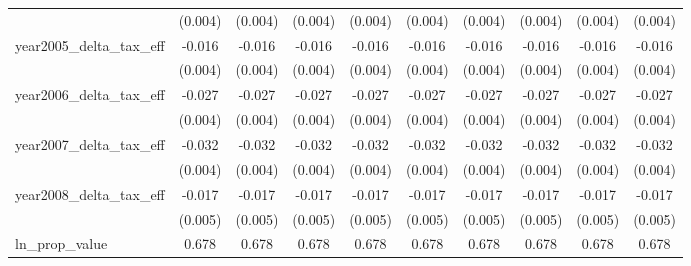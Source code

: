 {\begin{tabular}{l*{9}{c}}
            &     (0.004)         &     (0.004)         &     (0.004)         &     (0.004)         &     (0.004)         &     (0.004)         &     (0.004)         &     (0.004)         &     (0.004)         \\
[1em]
year2005_delta_tax_eff&      -0.016\sym{***}&      -0.016\sym{***}&      -0.016\sym{***}&      -0.016\sym{***}&      -0.016\sym{***}&      -0.016\sym{***}&      -0.016\sym{***}&      -0.016\sym{***}&      -0.016\sym{***}\\
            &     (0.004)         &     (0.004)         &     (0.004)         &     (0.004)         &     (0.004)         &     (0.004)         &     (0.004)         &     (0.004)         &     (0.004)         \\
[1em]
year2006_delta_tax_eff&      -0.027\sym{***}&      -0.027\sym{***}&      -0.027\sym{***}&      -0.027\sym{***}&      -0.027\sym{***}&      -0.027\sym{***}&      -0.027\sym{***}&      -0.027\sym{***}&      -0.027\sym{***}\\
            &     (0.004)         &     (0.004)         &     (0.004)         &     (0.004)         &     (0.004)         &     (0.004)         &     (0.004)         &     (0.004)         &     (0.004)         \\
[1em]
year2007_delta_tax_eff&      -0.032\sym{***}&      -0.032\sym{***}&      -0.032\sym{***}&      -0.032\sym{***}&      -0.032\sym{***}&      -0.032\sym{***}&      -0.032\sym{***}&      -0.032\sym{***}&      -0.032\sym{***}\\
            &     (0.004)         &     (0.004)         &     (0.004)         &     (0.004)         &     (0.004)         &     (0.004)         &     (0.004)         &     (0.004)         &     (0.004)         \\
[1em]
year2008_delta_tax_eff&      -0.017\sym{***}&      -0.017\sym{***}&      -0.017\sym{***}&      -0.017\sym{***}&      -0.017\sym{***}&      -0.017\sym{***}&      -0.017\sym{***}&      -0.017\sym{***}&      -0.017\sym{***}\\
            &     (0.005)         &     (0.005)         &     (0.005)         &     (0.005)         &     (0.005)         &     (0.005)         &     (0.005)         &     (0.005)         &     (0.005)         \\
[1em]
ln_prop_value&       0.678\sym{***}&       0.678\sym{***}&       0.678\sym{***}&       0.678\sym{***}&       0.678\sym{***}&       0.678\sym{***}&       0.678\sym{***}&       0.678\sym{***}&       0.678\sym{***}\\

\end{tabular}}
